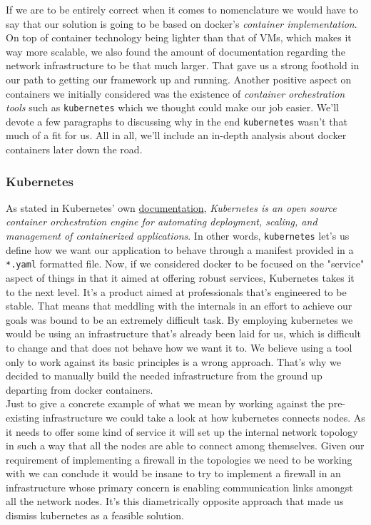                     If we are to be entirely correct when it comes to nomenclature we would have to say that our solution is going to be based on docker's \textit{container implementation}.\\

                On top of container technology being lighter than that of VMs, which makes it way more scalable, we also found the amount of documentation regarding the network infrastructure to be that much larger. That gave us a strong foothold in our path to getting our framework up and running. Another positive aspect on containers we initially considered was the existence of \textit{container orchestration tools} such as \texttt{kubernetes} which we thought could make our job easier. We'll devote a few paragraphs to discussing why in the end \texttt{kubernetes} wasn't that much of a fit for us. All in all, we'll include an in-depth analysis about docker containers later down the road.

            \subsubsection{Kubernetes}
                As stated in Kubernetes' own \href{https://kubernetes.io/docs/home/}{documentation}, \textit{Kubernetes is an open source container orchestration engine for automating deployment, scaling, and management of containerized applications}. In other words, \texttt{kubernetes} let's us define how we want our application to behave through a manifest provided in a \texttt{*.yaml} formatted file. Now, if we considered docker to be focused on the "service" aspect of things in that it aimed at offering robust services, Kubernetes takes it to the next level. It's a product aimed at professionals that's engineered to be stable. That means that meddling with the internals in an effort to achieve our goals was bound to be an extremely difficult task. By employing kubernetes we would be using an infrastructure that's already been laid for us, which is difficult to change and that does not behave how we want it to. We believe using a tool only to work against its basic principles is a wrong approach. That's why we decided to manually build the needed infrastructure from the ground up departing from docker containers.\\

                Just to give a concrete example of what we mean by working against the pre-existing infrastructure we could take a look at how kubernetes connects nodes. As it needs to offer some kind of service it will set up the internal network topology in such a way that all the nodes are able to connect among themselves. Given our requirement of implementing a firewall in the topologies we need to be working with we can conclude it would be insane to try to implement a firewall in an infrastructure whose primary concern is enabling communication links amongst all the network nodes. It's this diametrically opposite approach that made us dismiss kubernetes as a feasible solution.\\

